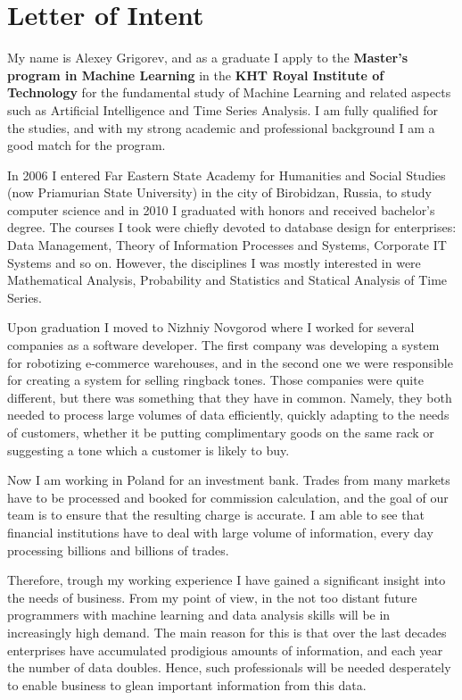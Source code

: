 \documentclass[a4paper,12pt]{article}
\begin{document}
\section*{Letter of Intent}

My name is Alexey Grigorev, and as a graduate I apply to the \textbf{Master's program in Machine Learning} in the \textbf{KHT Royal Institute of Technology} for the fundamental study of Machine Learning and related aspects such as Artificial Intelligence and Time Series Analysis. I am fully qualified for the studies, and with my strong academic and professional background I am a good match for the program. 

In 2006 I entered Far Eastern State Academy for Humanities and Social Studies (now Priamurian State University) in the city of Birobidzan, Russia, to study computer science and in 2010 I graduated with honors and received bachelor's degree. The courses I took were chiefly devoted to database design for enterprises: Data Management, Theory of Information Processes and Systems, Corporate IT Systems and so on. However, the disciplines I was mostly interested in were Mathematical Analysis, Probability and Statistics and Statical Analysis of Time Series.

Upon graduation I moved to Nizhniy Novgorod where I worked for several companies as a software developer. The first company was developing a system for robotizing e-commerce warehouses, and in the second one we were responsible for creating a system for selling ringback tones. Those companies were quite different, but there was something that they have in common. Namely, they both needed to process large volumes of data efficiently, quickly adapting to the needs of customers, whether it be putting complimentary goods on the same rack or suggesting a tone which a customer is likely to buy.

Now I am working in Poland for an investment bank. Trades from many markets have to be processed and booked for commission calculation, and the goal of our team is to ensure that the resulting charge is accurate. I am able to see that financial institutions have to deal with large volume of information, every day processing billions and billions of trades.

Therefore, trough my working experience I have gained a significant insight into the needs of business. From my point of view, in the not too distant future programmers with machine learning and data analysis skills will be in increasingly high demand. The main reason for this is that over the last decades enterprises have accumulated prodigious amounts of information, and each year the number of data doubles. Hence, such professionals will be needed desperately to enable business to glean important information from this data.
\end{document}
